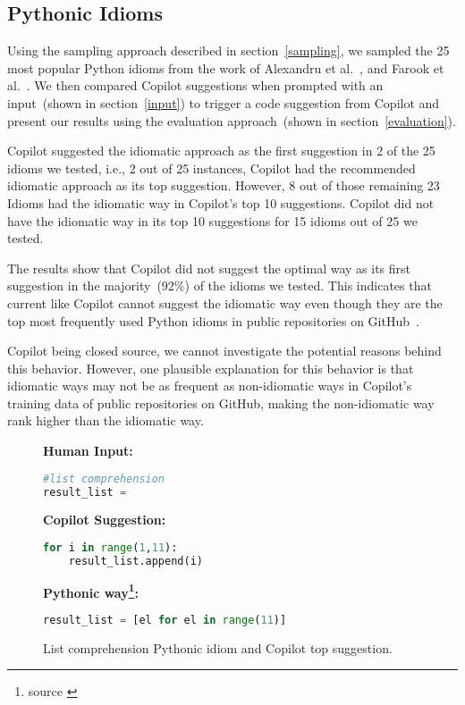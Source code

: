 \subsection{Pythonic Idioms}
\label{idioms}
Using the sampling approach described in section~\ref{sampling}, we sampled the 25 most popular Python idioms from the work of Alexandru et al.~\cite{Alexandru2018}, and Farook et al.~\cite{idioms}. 
We then compared Copilot suggestions when prompted with an input~(shown in section~\ref{input}) to trigger a code suggestion from Copilot and present our results using the evaluation approach~(shown in section~\ref{evaluation}).

Copilot suggested the idiomatic approach as the first suggestion in 2 of the 25 idioms we tested, i.e., 2 out of 25 instances, Copilot had the recommended idiomatic approach as its top suggestion. 
However, 8 out of those remaining 23 Idioms had the idiomatic way in Copilot's top 10 suggestions. Copilot did not have the idiomatic way in its top 10 suggestions for 15 idioms out of 25 we tested.

The results show that Copilot did not suggest the optimal way as its first suggestion in the majority~(92\%) of the idioms we tested. This indicates that current \cct{} like Copilot cannot suggest the idiomatic way even though they are the top most frequently used Python idioms in public repositories on GitHub~\cite{Alexandru2018, idioms}. 

Copilot being closed source, we cannot investigate the potential reasons behind this behavior. However, one plausible explanation for this behavior is that idiomatic ways may not be as frequent as non-idiomatic ways in Copilot's training data of public repositories on GitHub, making the non-idiomatic way rank higher than the idiomatic way.

\begin{figure}[hbt!]
    \centering
\begin{tcolorbox}[title=List Comprehension,boxsep=.25mm]
\textbf{Human Input:}
\begin{lstlisting}[language={Python}]
#list comprehension
result_list = 
\end{lstlisting}
\tcbline
\textbf{Copilot Suggestion:}
\begin{lstlisting}[language=Python,escapechar=\%]
% \noindent\textcolor{gray}{result\_list  =} % []
for i in range(1,11):
    result_list.append(i)
\end{lstlisting}
\tcbline
\textbf{Pythonic way\footnote{source \cite{Alexandru2018}}:}
\begin{lstlisting}[language=Python]
result_list = [el for el in range(11)]
\end{lstlisting}
\end{tcolorbox}
    \caption{List comprehension Pythonic idiom and Copilot top suggestion.}
    \label{fig:idioms_1}
\end{figure}

